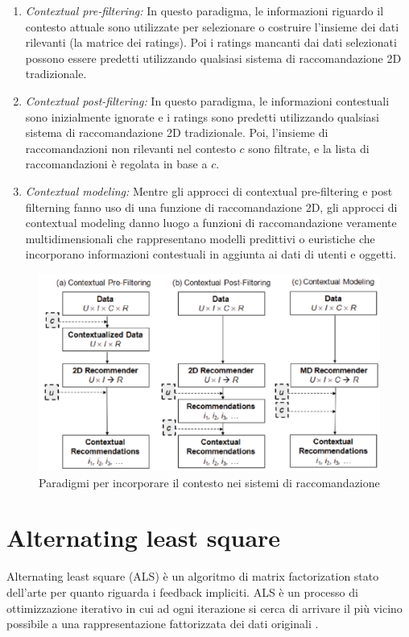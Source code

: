 \documentclass[12pt,italian]{report}
\begin{document}
\begin{enumerate}
 \item \textit{Contextual pre-filtering:} In questo paradigma, le informazioni riguardo il contesto attuale sono utilizzate per selezionare o costruire l'insieme dei dati rilevanti (la matrice dei ratings). Poi i ratings mancanti dai dati selezionati possono essere predetti utilizzando qualsiasi sistema di raccomandazione 2D tradizionale.
 \item \textit{Contextual post-filtering:} In questo paradigma, le informazioni contestuali sono inizialmente ignorate e i ratings sono predetti utilizzando qualsiasi sistema di raccomandazione 2D tradizionale. Poi, l'insieme di raccomandazioni non rilevanti nel contesto $c$ sono filtrate, e la lista di raccomandazioni è regolata in base a $c$.
 \item  \textit{Contextual modeling:} Mentre gli approcci di contextual pre-filtering e post filterning fanno uso di una funzione di raccomandazione 2D, gli approcci di contextual modeling danno luogo a funzioni di raccomandazione veramente multidimensionali che rappresentano modelli predittivi o euristiche che incorporano informazioni contestuali in aggiunta ai dati di utenti e oggetti.
\end{enumerate}

\begin{figure}
  \includegraphics[width=\linewidth]{immagini/paradigm_for_context_inclusion.png}
  \caption{Paradigmi per incorporare il contesto nei sistemi di raccomandazione}
  \label{fig:context-paradigm}
\end{figure}

\section{Alternating least square}
Alternating least square (ALS) \cite{als} è un algoritmo di matrix factorization stato dell'arte per quanto riguarda i feedback impliciti. ALS è un processo di ottimizzazione iterativo in cui ad ogni iterazione si cerca di arrivare il più vicino possibile a una rappresentazione fattorizzata dei dati originali \cite{als-medium}. 
\end{document}
